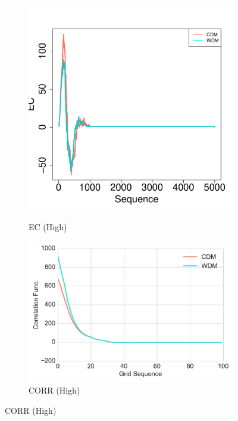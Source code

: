 \documentclass[12pt]{article}
\begin{document}
\begin{figure}[htp!]
  \centering
    \begin{subfigure}{0.21\textwidth}
    \centering
        \caption{EC (High)}
\includegraphics[width=\linewidth]{figure_13_max_margin_2euler.pdf}
    \label{fig:valid1}
  \end{subfigure}
    \begin{subfigure}{0.24\textwidth}
    \centering
        \caption{CORR (High)}
\includegraphics[width=\linewidth]{figure_13_max_margin_corr.pdf}

\end{subfigure}
\end{figure}
\end{document}
